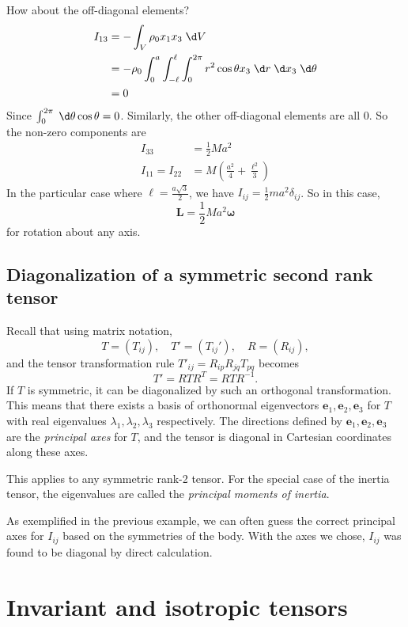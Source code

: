 \documentclass[a4paper]{article}
\begin{document}
\begin{eg}
  How about the off-diagonal elements?
  \begin{align*}
    I_{13} &= -\int_V \rho_0 x_1 x_3 \;\d V\\
    &= -\rho_0 \int_0^a \int_{-\ell}^\ell \int_0^{2\pi} r^2 \cos \theta x_3 \;\d r\;\d x_3 \;\d \theta\\
    &= 0
  \end{align*}
  Since $\int_0^{2\pi} \;\d \theta \cos \theta = 0$. Similarly, the other off-diagonal elements are all 0. So the non-zero components are
  \begin{align*}
    I_{33} &= \frac{1}{2}Ma^2\\
    I_{11} = I_{22} &= M\left(\frac{a^2}{4} + \frac{\ell^2}{3}\right)
  \end{align*}
  In the particular case where $\ell = \frac{a\sqrt{3}}{2}$, we have $I_{ij} = \frac{1}{2}ma^2 \delta_{ij}$. So in this case,
  \[
    \mathbf{L} = \frac{1}{2}Ma^2 \boldsymbol\omega
  \]
  for rotation about any axis.
\end{eg}

\subsection{Diagonalization of a symmetric second rank tensor}
Recall that using matrix notation,
\[
  T = (T_{ij}),\quad T' = (T_{ij}'),\quad R = (R_{ij}),
\]
and the tensor transformation rule $T'_{ij} = R_{ip}R_{jq}T_{pq}$ becomes
\[
  T' = RTR^T = RTR^{-1}.
\]
If $T$ is symmetric, it can be diagonalized by such an orthogonal transformation. This means that there exists a basis of orthonormal eigenvectors $\mathbf{e}_1, \mathbf{e}_2, \mathbf{e}_3$ for $T$ with real eigenvalues $\lambda_1, \lambda_2, \lambda_3$ respectively. The directions defined by $\mathbf{e}_1, \mathbf{e}_2, \mathbf{e}_3$ are the \emph{principal axes} for $T$, and the tensor is diagonal in Cartesian coordinates along these axes.

This applies to any symmetric rank-2 tensor. For the special case of the inertia tensor, the eigenvalues are called the \emph{principal moments of inertia}.

As exemplified in the previous example, we can often guess the correct principal axes for $I_{ij}$ based on the symmetries of the body. With the axes we chose, $I_{ij}$ was found to be diagonal by direct calculation.

\section{Invariant and isotropic tensors}
\end{document}

